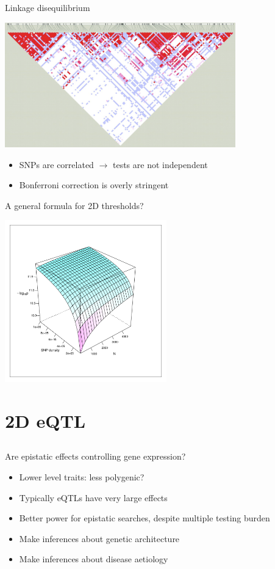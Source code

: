 \documentclass{beamer}
\begin{document}
\begin{frame}{Linkage disequilibrium}
\begin{center}
\includegraphics[width=10cm]{ld.png}
\end{center}
\begin{itemize}
\item SNPs are correlated $\rightarrow$ tests are not independent
\item Bonferroni correction is overly stringent
\end{itemize}
\end{frame}

\begin{frame}{A general formula for 2D thresholds?}
\begin{center}
\includegraphics[height=7cm]{threshold_function.pdf}
\end{center}
\end{frame}


\section{2D eQTL}
\subsection{}

\begin{frame}{Are epistatic effects controlling gene expression?}
	\begin{itemize}
		\item Lower level traits: less polygenic?
		\item Typically eQTLs have very large effects
		\item Better power for epistatic searches, despite multiple testing burden
		\item Make inferences about genetic architecture
		\item Make inferences about disease aetiology 
	\end{itemize}
\end{frame}
\end{document}
